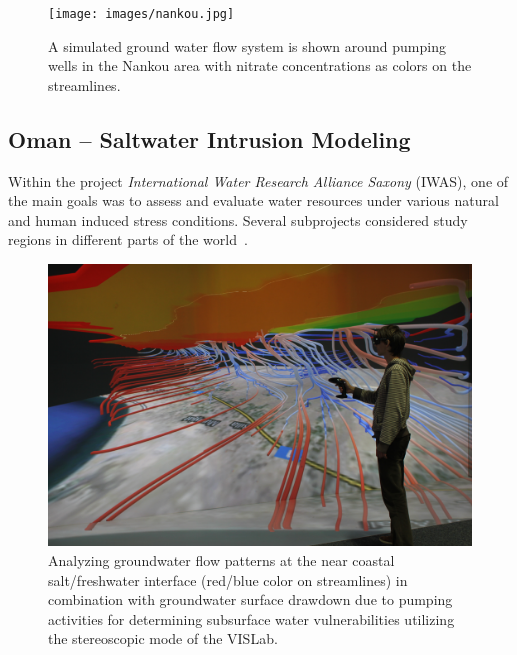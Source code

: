 \documentclass[twocolumn]{svjour3}          %
\begin{document}
\begin{figure}[htb]
  \texttt{[image: images/nankou.jpg]}
\caption{A simulated ground water flow system is shown around pumping wells in the Nankou area with nitrate concentrations as colors on the streamlines.}
\label{fig:nankou}
\end{figure}

\subsection{Oman -- Saltwater Intrusion Modeling}
\label{oman---saltwater-intrusion}

Within the project \emph{International Water Research Alliance Saxony} (IWAS), one of the main goals was to assess and evaluate water resources under various natural and human induced stress conditions. Several subprojects considered study regions in different parts of the world~\cite{kalbus:ees}.

\begin{figure}[htb]
  \includegraphics[width=\linewidth]{images/oman.jpg}
\caption{Analyzing groundwater flow patterns at the near coastal salt/freshwater interface (red/blue color on streamlines) in combination with groundwater surface drawdown due to pumping activities for determining subsurface water vulnerabilities utilizing the stereoscopic mode of the VISLab.}
\label{fig:oman}
\end{figure}
\end{document}
